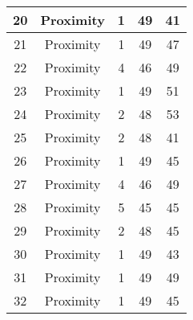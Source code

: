 \documentclass[results.tex]{subfiles}
\begin{document}
\begin{center}
\begin{tabular}{| c || c | c | c | c |}
            \hline
            20                      & Proximity                    & 1                      & 49                      & 41                   \\
            \hline
            21                      & Proximity                    & 1                      & 49                      & 47                   \\
            \hline
            22                      & Proximity                    & 4                      & 46                      & 49                   \\
            \hline
            23                      & Proximity                    & 1                      & 49                      & 51                   \\
            \hline
            24                      & Proximity                    & 2                      & 48                      & 53                   \\
            \hline
            25                      & Proximity                    & 2                      & 48                      & 41                   \\
            \hline
            26                      & Proximity                    & 1                      & 49                      & 45                   \\
            \hline
            27                      & Proximity                    & 4                      & 46                      & 49                   \\
            \hline
            28                      & Proximity                    & 5                      & 45                      & 45                   \\
            \hline
            29                      & Proximity                    & 2                      & 48                      & 45                   \\
            \hline
            30                      & Proximity                    & 1                      & 49                      & 43                   \\
            \hline
            31                      & Proximity                    & 1                      & 49                      & 49                   \\
            \hline
            32                      & Proximity                    & 1                      & 49                      & 45                   \\

\end{tabular}
\end{center}
\end{document}
